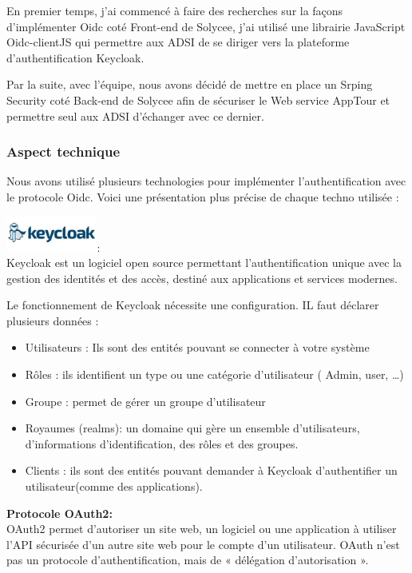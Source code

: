 \documentclass[12pt]{article}
\begin{document}
En premier temps, j'ai commencé à faire des recherches sur la façons d'implémenter Oidc coté Front-end de Solycee, j'ai utilisé une librairie JavaScript Oidc-clientJS qui permettre aux ADSI de se diriger vers la plateforme d'authentification Keycloak.

Par la suite, avec l'équipe, nous avons décidé de mettre en place un Srping Security coté Back-end de Solycee afin de sécuriser le Web service AppTour et permettre seul aux ADSI d'échanger avec ce dernier.  
 
\subsubsection{Aspect technique}

Nous avons utilisé plusieurs technologies pour implémenter l'authentification avec le protocole Oidc. Voici une présentation plus précise de chaque techno utilisée : 

\includegraphics[width=30mm,scale=0.5]{diagrammes/logo_Keycloak.jpeg}: \\

Keycloak  est un logiciel open source permettant l'authentification unique avec la gestion des identités et des accès, destiné aux applications et services modernes. 

Le fonctionnement de Keycloak nécessite une configuration. IL faut déclarer plusieurs données : 
\begin{itemize}
\item Utilisateurs : Ils sont des entités pouvant se connecter à votre système
\item Rôles : ils identifient un type ou une catégorie d’utilisateur ( Admin, user, …)
\item Groupe : permet de gérer un groupe d’utilisateur
\item Royaumes (realms): un domaine qui gère un ensemble d’utilisateurs, d’informations d’identification, des rôles et des groupes.
\item Clients : ils sont des entités pouvant demander à Keycloak d’authentifier un utilisateur(comme des applications).
\end{itemize}
 
\textbf{Protocole OAuth2:}\\ 

OAuth2 permet d'autoriser un site web, un logiciel ou une application à utiliser l'API sécurisée d'un autre site web pour le compte d'un utilisateur. OAuth n'est pas un protocole d'authentification, mais de « délégation d'autorisation ».
\newpage
\end{document}
